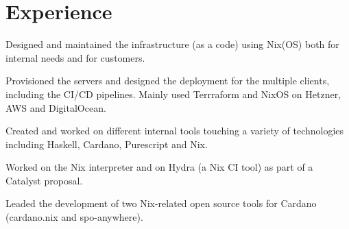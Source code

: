 \documentclass[]{cv}
\begin{document}
%
%

%
%

%
%

\begin{minipage}[t]{0.60\textwidth}


\section{Experience}
\vspace{\topsep} %
\begin{tightemize}
\item Designed and maintained the infrastructure (as a code) using Nix(OS) both for internal needs and for customers. 
\item Provisioned the servers and designed the deployment for the multiple clients, including the CI/CD pipelines. Mainly used Terrraform and NixOS on Hetzner, AWS and DigitalOcean.
\item Created and worked on different internal tools touching a variety of technologies including Haskell, Cardano, Purescript and Nix.
\item Worked on the Nix interpreter and on Hydra (a Nix CI tool) as part of a Catalyst proposal.
\item Leaded the development of two Nix-related open source tools for Cardano (cardano.nix and spo-anywhere). 
\end{tightemize}
\sectionsep


\end{minipage}
\end{document}
